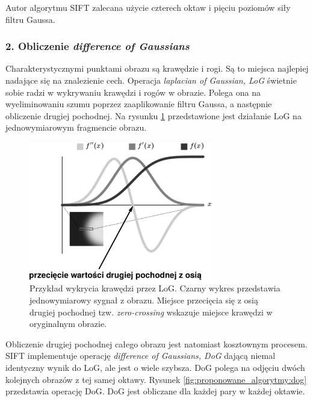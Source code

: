 Autor algorytmu SIFT zalecana użycie czterech oktaw i pięciu poziomów siły filtru Gaussa.

\subsubsection{2. Obliczenie \textit{difference of Gaussians}}
\label{sec:proponowane_algorytmy:difference}

Charakterystycznymi punktami obrazu są krawędzie i rogi. Są to miejsca najlepiej nadające się na znalezienie cech. Operacja \textit{laplacian of Gaussian, LoG} świetnie sobie radzi w wykrywaniu krawędzi i rogów w obrazie. Polega ona na wyeliminowaniu szumu poprzez zaaplikowanie filtru Gaussa, a następnie obliczenie drugiej pochodnej. Na rysunku \ref{fig:proponowane_algorytmy:gauss} przedstawione jest działanie LoG na jednowymiarowym fragmencie obrazu.

\begin{figure}[H]
  \centering
  \includegraphics[width=8cm]{gfx/gauss}
  \caption{Przykład wykrycia krawędzi przez LoG. Czarny wykres przedstawia jednowymiarowy sygnał z obrazu. Miejsce przecięcia się z osią drugiej pochodnej tzw. \textit{zero-crossing} wskazuje miejsce krawędzi w oryginalnym obrazie.}
  \label{fig:proponowane_algorytmy:gauss}
\end{figure}

Obliczenie drugiej pochodnej całego obrazu jest natomiast kosztownym procesem. SIFT implementuje operację \textit{difference of Gaussians, DoG} dającą niemal identyczny wynik do LoG, ale jest o wiele szybsza. DoG polega na odjęciu dwóch kolejnych obrazów z tej samej oktawy. Rysunek \ref{fig:proponowane_algorytmy:dog} przedstawia operację DoG. DoG jest obliczane dla każdej pary w każdej oktawie.

